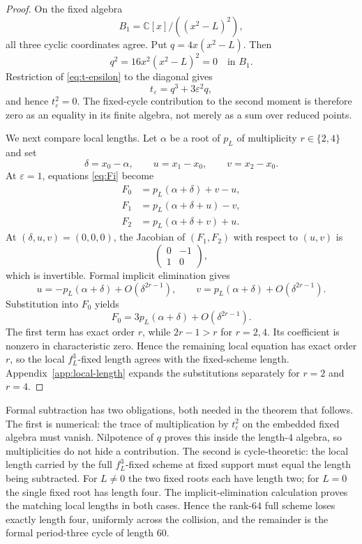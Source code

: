 \documentclass[11pt]{article}
\theoremstyle{definition}
\newcommand{\C}{\mathbb C}
\begin{document}
{\begin{proof}
On the fixed algebra
\[
B_1=\C[x]/((x^2-L)^2),
\]
all three cyclic coordinates agree. Put $q=4x(x^2-L)$. Then
\[
q^2=16x^2(x^2-L)^2=0
\quad\text{in }B_1.
\]
Restriction of \eqref{eq:t-epsilon} to the diagonal gives
\[
t_\varepsilon=q^3+3\varepsilon^2q,
\]
and hence $t_\varepsilon^2=0$. The fixed-cycle contribution to the second moment is therefore zero as an equality in its finite algebra, not merely as a sum over reduced points.

We next compare local lengths. Let $\alpha$ be a root of $p_L$ of multiplicity $r\in\{2,4\}$ and set
\[
\delta=x_0-\alpha,
\qquad
u=x_1-x_0,
\qquad
v=x_2-x_0.
\]
At $\varepsilon=1$, equations \eqref{eq:Fi} become
\begin{align*}
F_0&=p_L(\alpha+\delta)+v-u,\\
F_1&=p_L(\alpha+\delta+u)-v,\\
F_2&=p_L(\alpha+\delta+v)+u.
\end{align*}
At $(\delta,u,v)=(0,0,0)$, the Jacobian of $(F_1,F_2)$ with respect to $(u,v)$ is
\[
\begin{pmatrix}0&-1\\1&0\end{pmatrix},
\]
which is invertible. Formal implicit elimination gives
\begin{equation}
u=-p_L(\alpha+\delta)+O(\delta^{2r-1}),
\qquad
v=p_L(\alpha+\delta)+O(\delta^{2r-1}).
\label{eq:uv-elimination}
\end{equation}
Substitution into $F_0$ yields
\begin{equation}
F_0
=3p_L(\alpha+\delta)+O(\delta^{2r-1}).
\label{eq:remaining-local-equation}
\end{equation}
The first term has exact order $r$, while $2r-1>r$ for $r=2,4$. Its coefficient is nonzero in characteristic zero. Hence the remaining local equation has exact order $r$, so the local $f_L^3$-fixed length agrees with the fixed-scheme length. Appendix~\ref{app:local-length} expands the substitutions separately for $r=2$ and $r=4$.
\end{proof}

Formal subtraction has two obligations, both needed in the theorem that follows. The first is numerical: the trace of multiplication by $t_\varepsilon^2$ on the embedded fixed algebra must vanish. Nilpotence of $q$ proves this inside the length-$4$ algebra, so multiplicities do not hide a contribution. The second is cycle-theoretic: the local length carried by the full $f_L^3$-fixed scheme at fixed support must equal the length being subtracted. For $L\ne0$ the two fixed roots each have length two; for $L=0$ the single fixed root has length four. The implicit-elimination calculation proves the matching local lengths in both cases. Hence the rank-$64$ full scheme loses exactly length four, uniformly across the collision, and the remainder is the formal period-three cycle of length $60$.

}
\end{document}

